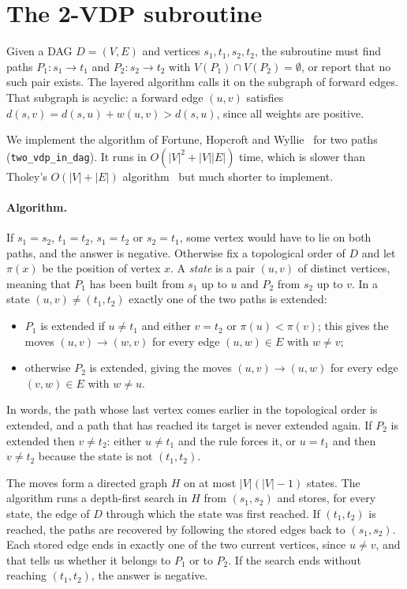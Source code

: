 \section{The 2-VDP subroutine}
\label{sec:twovdp}

Given a DAG $D=(V,E)$ and vertices $s_1,t_1,s_2,t_2$, the subroutine
must find paths $P_1\colon s_1\to t_1$ and $P_2\colon s_2\to t_2$ with
$V(P_1)\cap V(P_2)=\emptyset$, or report that no such pair exists. The
layered algorithm calls it on the subgraph of forward edges. That
subgraph is acyclic: a forward edge $(u,v)$ satisfies
$d(s,v)=d(s,u)+w(u,v)>d(s,u)$, since all weights are positive.

We implement the algorithm of Fortune, Hopcroft and
Wyllie~\cite{FortuneHopcroftWyllie1980} for two paths
(\texttt{two\_vdp\_in\_dag}). It runs in $O(|V|^{2}+|V||E|)$ time, which
is slower than Tholey's $O(|V|+|E|)$ algorithm~\cite{Tholey2012} but
much shorter to implement.

\paragraph{Algorithm.} If $s_1=s_2$, $t_1=t_2$, $s_1=t_2$ or $s_2=t_1$,
some vertex would have to lie on both paths, and the answer is
negative. Otherwise fix a topological order of $D$ and let $\pi(x)$ be
the position of vertex $x$. A \emph{state} is a pair $(u,v)$ of distinct
vertices, meaning that $P_1$ has been built from $s_1$ up to $u$ and
$P_2$ from $s_2$ up to $v$. In a state $(u,v)\neq(t_1,t_2)$ exactly one
of the two paths is extended:
\begin{itemize}
  \item $P_1$ is extended if $u\neq t_1$ and either $v=t_2$ or
    $\pi(u)<\pi(v)$; this gives the moves $(u,v)\to(w,v)$ for every edge
    $(u,w)\in E$ with $w\neq v$;
  \item otherwise $P_2$ is extended, giving the moves $(u,v)\to(u,w)$
    for every edge $(v,w)\in E$ with $w\neq u$.
\end{itemize}
In words, the path whose last vertex comes earlier in the topological
order is extended, and a path that has reached its target is never
extended again. If $P_2$ is extended then $v\neq t_2$: either $u\neq
t_1$ and the rule forces it, or $u=t_1$ and then $v\neq t_2$ because the
state is not $(t_1,t_2)$.

The moves form a directed graph $H$ on at most $|V|(|V|-1)$ states. The
algorithm runs a depth-first search in $H$ from $(s_1,s_2)$ and stores,
for every state, the edge of $D$ through which the state was first
reached. If $(t_1,t_2)$ is reached, the paths are recovered by following
the stored edges back to $(s_1,s_2)$. Each stored edge ends in exactly
one of the two current vertices, since $u\neq v$, and that tells us
whether it belongs to $P_1$ or to $P_2$. If the search ends without
reaching $(t_1,t_2)$, the answer is negative.

